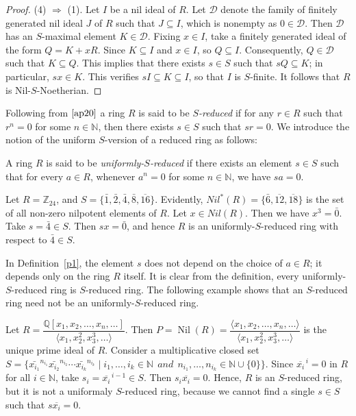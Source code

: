 \documentclass[11pt]{article}
\begin{document}
\begin{proof}
	\item (4) $\Rightarrow$ (1). Let $I$ be a nil ideal of $R$. Let $\mathcal{D}$ denote  the family of finitely generated nil ideal $J$ of $R$ such that $J\subseteq I$, which is nonempty as $0\in\mathcal{D}$. Then $\mathcal{D}$ has an $S$-maximal element $K\in\mathcal{D}$. Fixing $x\in I$, take a finitely generated ideal of the form $Q= K + xR$. Since $K\subseteq I$ and $x\in I$, so $Q\subseteq I$. Consequently, $Q\in\mathcal{D}$ such that $K\subseteq Q$. This implies that there exists $s\in S$ such that $sQ\subseteq K$; in particular, $sx\in K$. This verifies $sI\subseteq K\subseteq I$, so that $I$ is $S$-finite. It follows that $R$ is Nil-$S$-Noetherian.
	
\end{proof}


Following from $\cite{ap20}$ a ring $R$ is said to be  \textit{$S$-reduced} if for any $r\in R$ such that $r^{n}=0$ for some $n \in\mathbb{N}$, then there exists $s\in S$ such that $sr= 0$. We introduce the notion of the uniform $S$-version of a reduced ring as follows:
 \begin{deff}\label{p1}
A ring $R$ is said to be \textit{uniformly-$S$-reduced} if there exists an element $s \in S$ such that for every $a \in R$, whenever $a^n = 0$ for some $n \in \mathbb{N}$, we have $sa = 0$.
\end{deff}
\begin{eg}\label{p2}
	Let $R=\mathbb{Z}_{24}$, and $S=\{\bar{1}, \bar{2}, \bar{4}, \bar{8}, \overline{16}\}$. Evidently, $Nil^*(R) = \{\bar{6}, \overline{12}, \overline{18} \}$ is the set of all non-zero nilpotent elements of $R$. Let $x\in Nil(R)$. Then we have $x^{3}=\bar{0}$. Take $s=\bar{4}\in S$. Then $sx=\bar{0}$, and hence $R$ is an uniformly-$S$-reduced ring with respect to $\bar{4}\in S$.
\end{eg}


In Definition~\ref{p1}, the element $s$ does not depend on the choice of $a \in R$; it depends only on the ring $R$ itself. It is clear from the definition, every uniformly-$S$-reduced ring is $S$-reduced ring. The following example shows that an $S$-reduced ring  need not be an uniformly-$S$-reduced ring.


	\begin{eg}
	\noindent
	Let $R=\dfrac{\mathbb{Q}[x_1,x_2,\ldots ,x_n,\ldots]}
	{\langle x_1,x_2^{2},x_3^{3},\ldots \rangle}$. Then $P= \operatorname{Nil}(R)=\dfrac{\langle x_1,x_2,\ldots ,x_n,\ldots \rangle}
	{\langle x_1,x_2^{2},x_3^{3},\ldots \rangle}$  is the unique prime ideal of $R$. Consider a multiplicative closed set $S=\{\bar{x_{i_1}}^{ n_{i_1}}\bar{x_{i_2}}^{n_{i_2}}\cdots \bar{x_{i_k}}^{n_{i_k}}\mid i_1,\ldots,i_k\in\mathbb{N}~~
	and~~n_{i_1},\ldots,n_{i_k}\in\mathbb{N}\cup\{0\}\}$. Since $\overline{x_i}^{\,i}=0$ in $R$ for all $i\in\mathbb{N}$, take $s_i=\overline{x_i}^{\,i-1}\in S$. Then $s_i\overline{x_i}=0$. Hence, $R$ is an $S$-reduced ring, but it is not a uniformaly
	$S$-reduced ring, because we cannot find a single $s\in S$
	such that $s\overline{x_i}=0$.
\end{eg}
\end{document}
